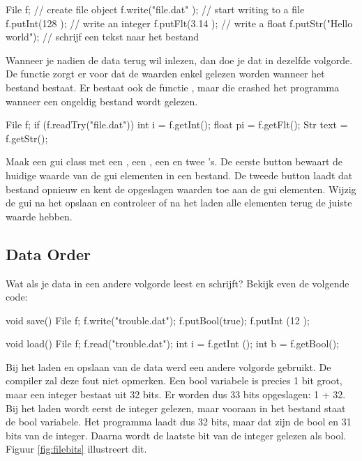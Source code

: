 \begin{code}
File f;                  // create file object
f.write("file.dat"    ); // start writing to a file
f.putInt(128          ); // write an integer
f.putFlt(3.14         ); // write a float
f.putStr("Hello world"); // schrijf een tekst naar het bestand
\end{code}

Wanneer je nadien de data terug wil inlezen, dan doe je dat in dezelfde volgorde. De functie  zorgt er voor dat de waarden enkel gelezen worden wanneer het bestand bestaat. Er bestaat ook de functie , maar die crashed het programma wanneer een ongeldig bestand wordt gelezen.

\begin{code}
File f;
if (f.readTry("file.dat")) {
	int   i    = f.getInt();
	float pi   = f.getFlt();
	Str   text = f.getStr();
}
\end{code}

\begin{exercise}
Maak een gui class met een , een , een  en twee 's. De eerste button bewaart de huidige waarde van de gui elementen in een bestand. De tweede button laadt dat bestand opnieuw en kent de opgeslagen waarden toe aan de gui elementen. Wijzig de gui na het opslaan en controleer of na het laden alle elementen terug de juiste waarde hebben. 
\end{exercise}

\subsection{Data Order}
Wat als je data in een andere volgorde leest en schrijft? Bekijk even de volgende code:

\begin{code}
void save() {
  File f;
	f.write("trouble.dat");
	f.putBool(true);
	f.putInt (12  );
}

void load() {
  File f;
	f.read("trouble.dat");
	int i = f.getInt ();
	int b = f.getBool();
}
\end{code}

Bij het laden en opslaan van de data werd een andere volgorde gebruikt. De compiler zal deze fout niet opmerken. Een bool variabele is precies 1 bit groot, maar een integer bestaat uit 32 bits. Er worden dus 33 bits opgeslagen: 1 + 32. Bij het laden wordt eerst de integer gelezen, maar vooraan in het bestand staat de bool variabele. Het programma laadt dus 32 bits, maar dat zijn de bool en 31 bits van de integer. Daarna wordt de laatste bit van de integer gelezen als bool. Figuur \ref{fig:filebits} illustreert dit.

